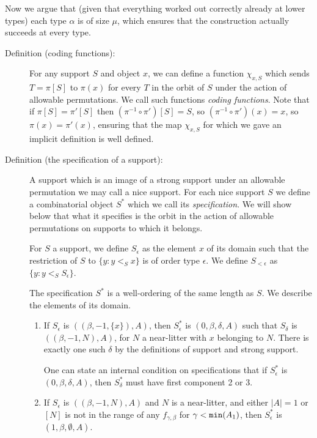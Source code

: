 \documentclass[112pt]{article}
\begin{document}
Now we argue that (given that everything worked out correctly already at lower types) each type $\alpha$ is of size $\mu$, which ensures
that the construction actually succeeds at every type.

\begin{description}

\item[Definition (coding functions):]  For any support $S$ and object $x$, we can define a function $\chi_{x,S}$ which sends $T=\pi[S]$ to $\pi(x)$ for every $T$ in the orbit of $S$ under
the action of allowable permutations.  We call such functions {\em coding functions\/}.  Note that if $\pi[S]=\pi'[S]$ then $(\pi^{-1}\circ \pi')[S]= S$, so 
$(\pi^{-1}\circ \pi')(x)= x$, so $\pi(x)=\pi'(x)$, ensuring that the map $\chi_{x,S}$ for which we gave an implicit definition is well defined.

\item[Definition (the specification of a support):]  A support which is an image of a strong support under an allowable permutation we may call a nice support.  For each nice support $S$ we define a combinatorial object $S^*$ which we call its {\em specification\/}.  We will show below that what it specifies is the orbit in the action of allowable permutations on supports to which it belongs.

For $S$ a support, we define $S_\epsilon$ as the element $x$ of its domain such that the restriction of $S$ to $\{y:y <_S x\}$ is of order type $\epsilon$.  We define
$S_{<\epsilon}$ as $\{y:y <_S S_\epsilon\}$.

The specification $S^*$ is a well-ordering of the same length as $S$.  We describe the elements of its domain.

\begin{enumerate}

\item  If $S_{\epsilon}$ is $((\beta,-1,\{x\}),A)$, then $S^*_\epsilon$ is $(0,\beta,\delta,A)$ such that $S_\delta$ is $((\beta,-1,N),A)$, for $N$ a near-litter with $x$ belonging to $N$.  There is exactly one such $\delta$ by the definitions of support and strong support.

One can state an internal condition on specifications that if $S^*_\epsilon$ is $(0,\beta,\delta,A)$, then $S^*_\delta$ must have first component 2 or 3.

\item  If $S_\epsilon$ is $((\beta,-1,N),A)$ and $N$ is a near-litter, and either $|A|=1$ or $[N]$ is not in the range of any $f_{\gamma,\beta}$ for $\gamma<{\tt min}(A_1)$, then $S^*_\epsilon$ is $(1,\beta,\emptyset,A)$.


\end{enumerate}
\end{description}
\end{document}
